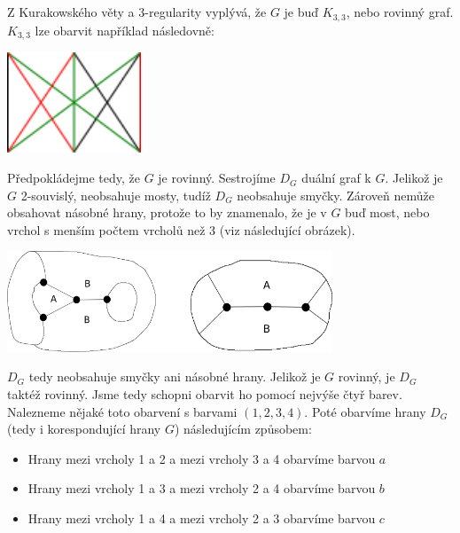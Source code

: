 \documentclass{scrartcl}
\begin{document}
    \section{}
    Z Kurakowského věty a 3-regularity vyplývá, že $G$ je buď $K_{3,3}$, nebo rovinný graf. $K_{3,3}$ lze obarvit například následovně:

    \begin{center}
        \includegraphics[height=3cm]{k33}            
    \end{center}

    Předpokládejme tedy, že $G$ je rovinný. Sestrojíme $D_G$ duální graf k $G$. Jelikož je $G$ 2-souvislý, neobsahuje mosty, tudíž $D_G$ neobsahuje smyčky. Zároveň nemůže obsahovat násobné hrany, protože to by znamenalo, že je v $G$ buď most, nebo vrchol s menším počtem vrcholů než 3 (viz následující obrázek).

    \begin{center}
        \includegraphics[height=3cm]{nasobne_hrany}
    \end{center}

    $D_G$ tedy neobsahuje smyčky ani násobné hrany. Jelikož je $G$ rovinný, je $D_G$ taktéž rovinný. Jsme tedy schopni obarvit ho pomocí nejvýše čtyř barev. Nalezneme nějaké toto obarvení s barvami $(1,2,3,4)$. Poté obarvíme hrany $D_G$ (tedy i korespondující hrany $G$) následujícím způsobem:

    \begin{itemize}
        \item Hrany mezi vrcholy 1 a 2 a mezi vrcholy 3 a 4 obarvíme barvou $a$
        \item Hrany mezi vrcholy 1 a 3 a mezi vrcholy 2 a 4 obarvíme barvou $b$
        \item Hrany mezi vrcholy 1 a 4 a mezi vrcholy 2 a 3 obarvíme barvou $c$
    \end{itemize}
\end{document}
